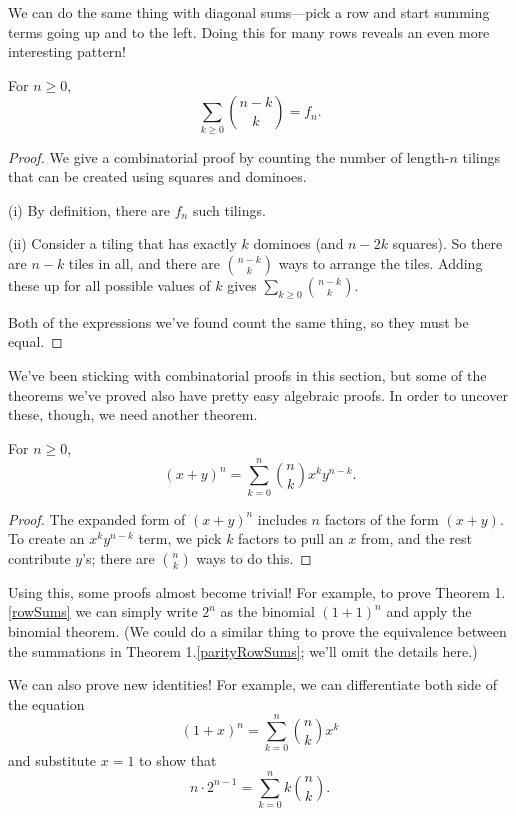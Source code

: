 \documentclass[../m055main.tex]{subfiles}
\begin{document}
We can do the same thing with diagonal sums---pick a row and start summing terms going up and to the left.
Doing this for many rows reveals an even more interesting pattern!

\begin{theorem}
    For $n \geq 0$,
    \[ \sum_{k \geq 0} {n-k \choose k} = f_n. \]
\end{theorem}

\begin{proof}
    We give a combinatorial proof by counting the number of length-$n$ tilings that can be created using squares and dominoes.
    \smallskip

    (i) By definition, there are $f_n$ such tilings.
    \smallskip

    (ii) Consider a tiling that has exactly $k$ dominoes (and $n-2k$ squares).
    So there are $n-k$ tiles in all, and there are ${n-k \choose k}$ ways to arrange the tiles.
    Adding these up for all possible values of $k$ gives $\sum\limits_{k \geq 0} {n-k \choose k}$.

    Both of the expressions we've found count the same thing, so they must be equal.
\end{proof}

We've been sticking with combinatorial proofs in this section, but some of the theorems we've proved also have pretty easy algebraic proofs.
In order to uncover these, though, we need another theorem.

\begin{theorem}
    For $n \geq 0$,
    \[ (x+y)^{n} = \sum_{k=0}^{n} {n \choose k} x^{k} y^{n-k}. \]
\end{theorem}

\begin{proof}
    The expanded form of $(x+y)^{n}$ includes $n$ factors of the form $(x+y)$.
    To create an $x^{k} y^{n-k}$ term, we pick $k$ factors to pull an $x$ from, and the rest contribute $y$'s; there are ${n \choose k}$ ways to do this.
\end{proof}

Using this, some proofs almost become trivial!
For example, to prove Theorem 1.\ref{rowSums} we can simply write $2^{n}$ as the binomial $(1+1)^{n}$ and apply the binomial theorem.
(We could do a similar thing to prove the equivalence between the summations in Theorem 1.\ref{parityRowSums}; we'll omit the details here.)

We can also prove new identities!
For example, we can differentiate both side of the equation
\[ (1+x)^{n} = \sum_{k=0}^{n} {n \choose k} x^{k} \]
and substitute $x=1$ to show that
\[ n \cdot 2^{n-1} = \sum_{k=0}^{n} k {n \choose k}. \]
\end{document}

